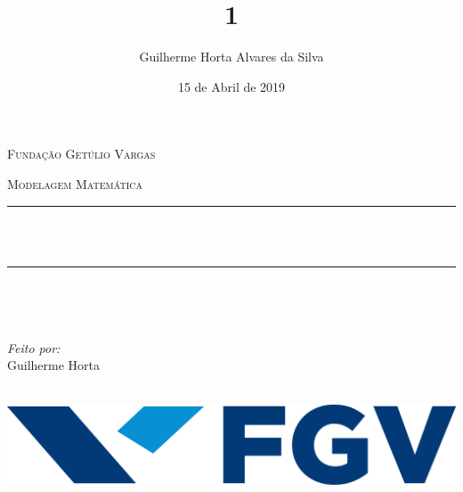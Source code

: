 \documentclass[12pt]{report}
\title{1}
\author{Guilherme Horta Alvares da Silva}
\date{15 de Abril de 2019}
\makeatletter
\let\thetitle\@title
\makeatother
\begin{document}

\begin{titlepage}
	\centering
    \vspace*{0.5 cm}
   \begin{center}    \textsc{\Large   Fundação Getúlio Vargas}\\[2.0 cm]	\end{center}%
   \textsc{\Large Modelagem Matemática  }\\[0.5 cm]				%
	\rule{\linewidth}{0.2 mm} \\[0.4 cm]
	{ \huge \bfseries \thetitle}\\
	\rule{\linewidth}{0.2 mm} \\[1.5 cm]
	
	\begin{minipage}{0.4\textwidth}
		\begin{flushleft} \large
			\end{flushleft}
			\end{minipage}~
			\begin{minipage}{0.4\textwidth}
            
			\begin{flushright} \large
        \emph{Feito por:} \\
      Guilherme Horta 
		\end{flushright}
           
	\end{minipage}\\[2 cm]
	
  \includegraphics[scale = 0.5]{FGV.png}
    
    
    
    
	
\end{titlepage}

\end{document}
